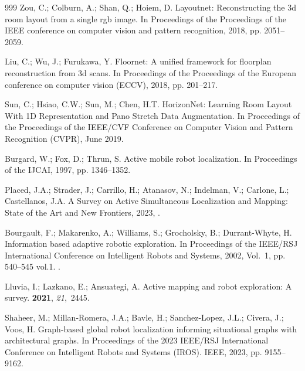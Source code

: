 \documentclass[10pt,a4paper]{article}
\begin{document}
\begin{thebibliography}{999}
Zou, C.; Colburn, A.; Shan, Q.; Hoiem, D.
\newblock Layoutnet: Reconstructing the 3d room layout from a single rgb image.
\newblock In Proceedings of the Proceedings of the IEEE conference on computer
  vision and pattern recognition,  2018, pp. 2051--2059.

Liu, C.; Wu, J.; Furukawa, Y.
\newblock Floornet: A unified framework for floorplan reconstruction from 3d
  scans.
\newblock In Proceedings of the Proceedings of the European conference on
  computer vision (ECCV),  2018, pp. 201--217.

Sun, C.; Hsiao, C.W.; Sun, M.; Chen, H.T.
\newblock HorizonNet: Learning Room Layout With 1D Representation and Pano
  Stretch Data Augmentation.
\newblock In Proceedings of the Proceedings of the IEEE/CVF Conference on
  Computer Vision and Pattern Recognition (CVPR),  June 2019.

Burgard, W.; Fox, D.; Thrun, S.
\newblock Active mobile robot localization.
\newblock In Proceedings of the IJCAI,  1997, pp. 1346--1352.

Placed, J.A.; Strader, J.; Carrillo, H.; Atanasov, N.; Indelman, V.; Carlone,
  L.; Castellanos, J.A.
\newblock A Survey on Active Simultaneous Localization and Mapping: State of
  the Art and New Frontiers,  2023,
  \href{http://arxiv.org/abs/2207.00254}{{\normalfont
  [arXiv:cs.RO/2207.00254]}}.

Bourgault, F.; Makarenko, A.; Williams, S.; Grocholsky, B.; Durrant-Whyte, H.
\newblock Information based adaptive robotic exploration.
\newblock In Proceedings of the IEEE/RSJ International Conference on
  Intelligent Robots and Systems,  2002, Vol.~1, pp. 540--545 vol.1.
.

Lluvia, I.; Lazkano, E.; Ansuategi, A.
\newblock Active mapping and robot exploration: A survey.
 {\bf 2021}, {\em 21},~2445.

Shaheer, M.; Millan-Romera, J.A.; Bavle, H.; Sanchez-Lopez, J.L.; Civera, J.;
  Voos, H.
\newblock Graph-based global robot localization informing situational graphs
  with architectural graphs.
\newblock In Proceedings of the 2023 IEEE/RSJ International Conference on
  Intelligent Robots and Systems (IROS). IEEE,  2023, pp. 9155--9162.


\end{thebibliography}
\end{document}
